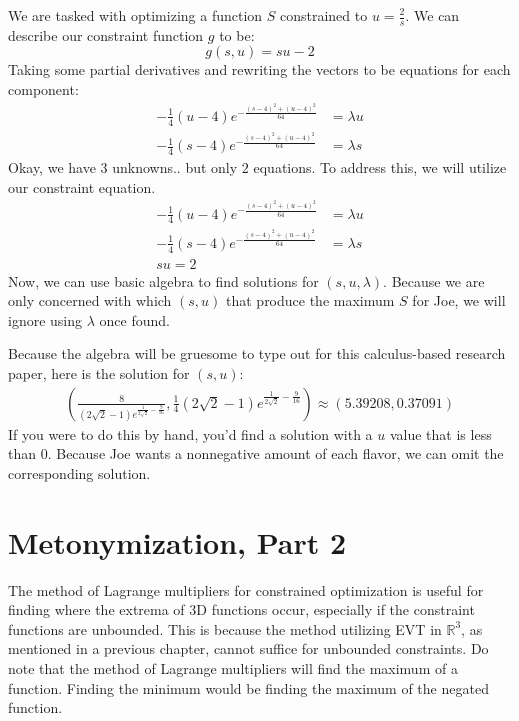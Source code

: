 \pagebreak
We are tasked with optimizing a function $S$ constrained to $u=\frac{2}{s}$. We can describe our constraint function $g$ to be:
\begin{equation}
	g(s, u) = su-2
\end{equation}
Taking some partial derivatives and rewriting the vectors to be equations for each component:
\begin{align*}
	-\frac{1}{4}(u-4)e^{-\frac{(s-4)^2+(u-4)^2}{64}} &= \lambda u\\
	-\frac{1}{4}(s-4)e^{-\frac{(s-4)^2+(u-4)^2}{64}} &= \lambda s
\end{align*}
Okay, we have $3$ unknowns.. but only $2$ equations.
To address this, we will utilize our constraint equation.
\begin{align*}
	-\frac{1}{4}(u-4)e^{-\frac{(s-4)^2+(u-4)^2}{64}} &= \lambda u\\
	-\frac{1}{4}(s-4)e^{-\frac{(s-4)^2+(u-4)^2}{64}} &= \lambda s\\
	su = 2
\end{align*}
Now, we can use basic algebra to find solutions for $(s, u, \lambda)$. Because we are only concerned with which $(s, u)$ that produce the maximum $S$ for Joe, we will ignore using $\lambda$ once found.

Because the algebra will be gruesome to type out for this calculus-based research paper, here is the solution for $(s, u)$:
\begin{align*}
	\left(\frac{8}{(2\sqrt{2}-1)e^{\frac{1}{2\sqrt{2}}-\frac{9}{16}}}, \frac{1}{4}(2\sqrt{2}-1)e^{\frac{1}{2\sqrt{2}}-\frac{9}{16}}\right) \approx (5.39208, 0.37091)
\end{align*}
If you were to do this by hand, you'd find a solution with a $u$ value that is less than $0$.
Because Joe wants a nonnegative amount of each flavor, we can omit the corresponding solution.
\setcounter{chapter}{7}
\chapter{Metonymization, Part 2} %
The method of Lagrange multipliers for constrained optimization is useful for finding where the extrema of $3$D functions occur, especially if the constraint functions are unbounded.
This is because the method utilizing EVT in $\mathbb{R}^3$, as mentioned in a previous chapter, cannot suffice for unbounded constraints.
Do note that the method of Lagrange multipliers will find the maximum of a function.
Finding the minimum would be finding the maximum of the negated function.


